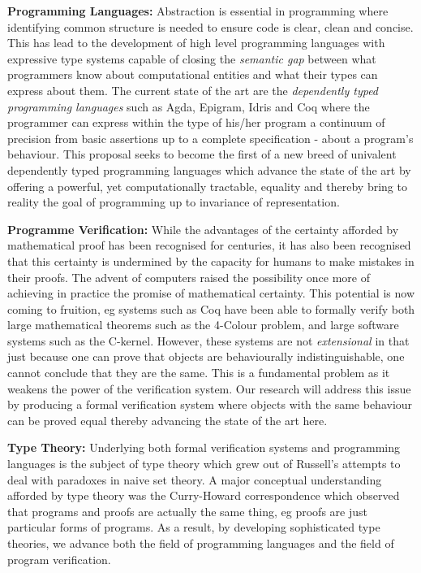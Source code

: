 \documentclass[a4paper,11pt]{article}
\begin{document}
{\bf Programming Languages:} Abstraction is essential in programming
where identifying common structure is needed to ensure code is clear,
clean and concise. This has lead to the development of high level
programming languages with expressive type systems capable of closing
the {\em semantic gap} between what programmers know about
computational entities and what their types can express about them.
The current state of the art are the {\em dependently typed
  programming languages} such as Agda, Epigram, Idris and Coq where
the programmer can express within the type of his/her program a
continuum of precision from basic assertions up to a complete
specification - about a program’s behaviour. This proposal seeks to
become the first of a new breed of univalent dependently typed
programming languages which advance the state of the art by offering a
powerful, yet computationally tractable, equality and thereby bring to
reality the goal of programming up to invariance of representation.


{\bf Programme Verification:} While the advantages of the certainty
afforded by mathematical proof has been recognised for centuries, it
has also been recognised that this certainty is undermined by the
capacity for humans to make mistakes in their proofs. The advent of
computers raised the possibility once more of achieving in practice
the promise of mathematical certainty. This potential is now coming to
fruition, eg systems such as Coq have been able to formally verify
both large mathematical theorems such as the 4-Colour problem, and
large software systems such as the C-kernel. However, these systems
are not {\em extensional} in that just because one can prove that
objects are behaviourally indistinguishable, one cannot conclude that
they are the same. This is a fundamental problem as it weakens the
power of the verification system. Our research will address this
issue by producing a formal verification system where objects with the
same behaviour can be proved equal thereby advancing the state of the
art here.


{\bf Type Theory:} Underlying both formal verification systems and
programming languages is the subject of type theory which grew out of
Russell's attempts to deal with paradoxes in naive set theory. A major
conceptual understanding afforded by type theory was the Curry-Howard
correspondence which observed that programs and proofs are actually
the same thing, eg proofs are just particular forms of programs. As a
result, by developing sophisticated type theories, we advance both the
field of programming languages and the field of program verification.
\end{document}
